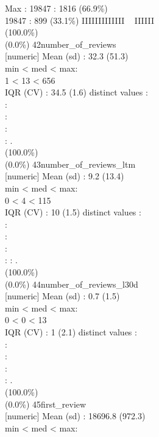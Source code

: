 \documentclass[
  journal,
]{IEEEtran}%
\begin{document}
Max : 19847  : 1816 (66.9\%)\\
19847 : 899 (33.1\%) \textbar{} \textbar IIIIIIIIIIIII ~ IIIIII
\\
(100.0\%) \\
(0.0\%) \textbar{} \textbar{} 42\textbar number\_of\_reviews\\
{[}numeric{]} \textbar Mean (sd) : 32.3 (51.3)\\
min \textless{} med \textless{} max:\\
1 \textless{} 13 \textless{} 656\\
IQR (CV) : 34.5 (1.6)  distinct values \textbar{} \textbar:\\
:\\
:\\
:\\
: . \\
(100.0\%) \\
(0.0\%) \textbar{} \textbar{} 43\textbar number\_of\_reviews\_ltm\\
{[}numeric{]} \textbar Mean (sd) : 9.2 (13.4)\\
min \textless{} med \textless{} max:\\
0 \textless{} 4 \textless{} 115\\
IQR (CV) : 10 (1.5)  distinct values \textbar{} \textbar:\\
:\\
:\\
:\\
: : . \\
(100.0\%) \\
(0.0\%) \textbar{} \textbar{} 44\textbar number\_of\_reviews\_l30d\\
{[}numeric{]} \textbar Mean (sd) : 0.7 (1.5)\\
min \textless{} med \textless{} max:\\
0 \textless{} 0 \textless{} 13\\
IQR (CV) : 1 (2.1)  distinct values \textbar{} \textbar:\\
:\\
:\\
:\\
: . \\
(100.0\%) \\
(0.0\%) \textbar{} \textbar{} 45\textbar first\_review\\
{[}numeric{]} \textbar Mean (sd) : 18696.8 (972.3)\\
min \textless{} med \textless{} max:\\
\end{document}
